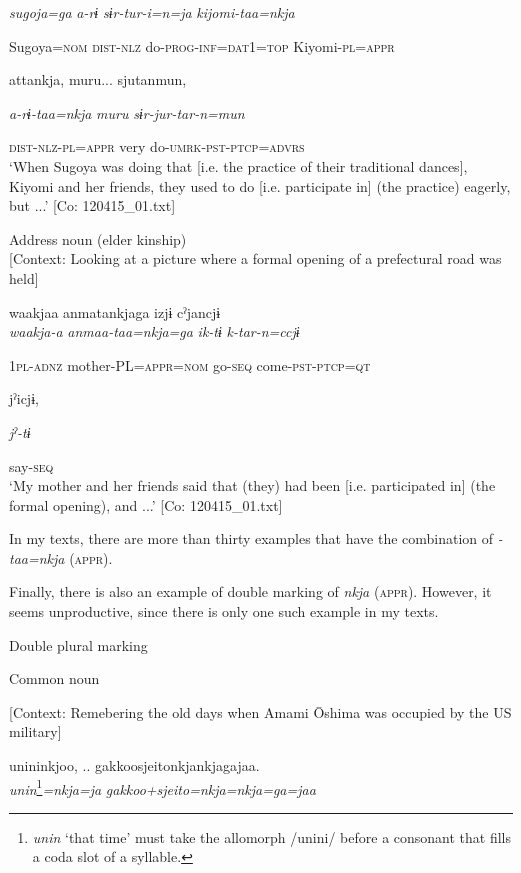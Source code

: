 \begin{table}
      \textit{sugoja=ga}  \textit{a-rɨ}  \textit{sɨr-tur-i=n=ja}  \textit{kijomi-taa=nkja}

      Sugoya=\textsc{nom}  \textsc{dist}-\textsc{nlz}  do-\textsc{prog}-\textsc{inf}=\textsc{dat}1=\textsc{top}  Kiyomi-\textsc{pl}=\textsc{appr}

      attankja,  muru...  sjutanmun,

      \textit{a-rɨ-taa=nkja}  \textit{muru}  \textit{sɨr-jur-tar-n=mun}

      \textsc{dist}-\textsc{nlz}-\textsc{pl}=\textsc{appr}  very  do-\textsc{umrk}-\textsc{pst}-\textsc{ptcp}=\textsc{advrs}\\
\glt ‘When Sugoya was doing that [i.e. the practice of their traditional dances], Kiyomi and her friends, they used to do [i.e. participate in] (the practice) eagerly, but ...’ [Co: 120415\_01.txt]
\z

\ex Address noun (elder kinship)\\{}
[Context: Looking at a picture where a formal opening of a prefectural road was held]

{\TM}
\glll waakjaa  anmatankjaga  izjɨ  cˀjancjɨ\\

      \textit{waakja-a}  \textit{anmaa-taa=nkja=ga}  \textit{ik-tɨ}  \textit{k-tar-n=ccjɨ}

      1\textsc{pl}-\textsc{adnz}  mother-PL=\textsc{appr}=\textsc{nom}  go-\textsc{seq}  come-\textsc{pst}-\textsc{ptcp}=\textsc{qt}

      jˀicjɨ,

      \textit{jˀ-tɨ}

      say-\textsc{seq}\\
\glt ‘My mother and her friends said that (they) had been [i.e. participated in] (the formal opening), and ...’ [Co: 120415\_01.txt]
\z

In my texts, there are more than thirty examples that have the combination of \textit{-taa=nkja} (\textsc{appr}).

Finally, there is also an example of double marking of \textit{nkja} (\textsc{appr}). However, it seems unproductive, since there is only one such example in my texts.

\ea\label{ex:6-104}
  Double plural marking

  Common noun

  [Context: Remebering the old days when Amami Ōshima was occupied by the US military]

{\TM}
\glll unininkjoo, ..\textsubscript{} {\textbar}gakkoosjeito{\textbar}nkjankjagajaa.\\
\textit{unin}\footnote{\textit{unin} ‘that time’ must take the allomorph /unini/ before a consonant that fills a coda slot of a syllable.}\textit{=nkja=ja}  \textit{gakkoo+sjeito=nkja=nkja=ga=jaa}\\


\end{table}

